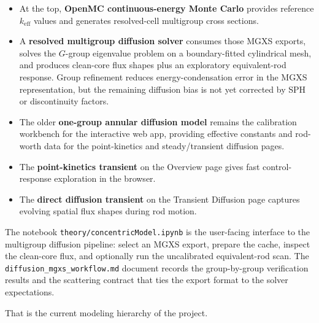 \documentclass[11pt]{article}
\begin{document}
\begin{itemize}
  \item At the top, \textbf{OpenMC continuous-energy Monte Carlo} provides
        reference $k_{\mathrm{eff}}$ values and generates resolved-cell
        multigroup cross sections.
  \item A \textbf{resolved multigroup diffusion solver} consumes those MGXS
        exports, solves the $G$-group eigenvalue problem on a
        boundary-fitted cylindrical mesh, and produces clean-core flux shapes
        plus an exploratory equivalent-rod response.  Group refinement reduces
        energy-condensation error in the MGXS representation, but the remaining
        diffusion bias is not yet corrected by SPH or discontinuity factors.
  \item The older \textbf{one-group annular diffusion model} remains the
        calibration workbench for the interactive web app, providing
        effective constants and rod-worth data for the point-kinetics and
        steady/transient diffusion pages.
  \item The \textbf{point-kinetics transient} on the Overview page gives
        fast control-response exploration in the browser.
  \item The \textbf{direct diffusion transient} on the Transient Diffusion
        page captures evolving spatial flux shapes during rod motion.
\end{itemize}

The notebook \texttt{theory/concentricModel.ipynb} is the user-facing
interface to the multigroup diffusion pipeline: select an MGXS export,
prepare the cache, inspect the clean-core flux, and optionally run the
uncalibrated equivalent-rod scan.  The
\texttt{diffusion\_mgxs\_workflow.md} document records the group-by-group
verification results and the scattering contract that ties the export
format to the solver expectations.

That is the current modeling hierarchy of the project.
\end{document}
